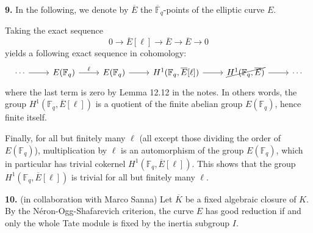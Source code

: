 \documentclass[a4paper]{article}
\newcommand{\Fq}{\mathbb{F}_q}
\newcommand{\Fqq}{\overline{\mathbb{F}}_q}
\newcommand{\E}{\overline{E}}
\theoremstyle{definition}
\theoremstyle{definition}
\theoremstyle{remark}
\theoremstyle{definition}
\begin{document}
\medskip\noindent\textbf{9.} In the following, we denote by $\E$ the $\Fqq$-points of the elliptic curve $E$.

\noindent Taking the exact sequence
\begin{equation*}
        0 \to \E[\ell] \to \E \to \E \to 0
\end{equation*}
yields a following exact sequence in cohomology:
\[
        \begin{tikzcd}
                \cdots \ar[r] & E(\Fq) \ar[r, "\ell"] &E(\Fq) \ar[r] &H^1(\Fq, \E[\ell]) \ar[r] &\cancel{H^1(\Fq, \E)} \ar[r] &\cdots
        \end{tikzcd}
\]
where the last term is zero by Lemma 12.12 in the notes. In others words, the group $H^1(\Fq, \E[\ell])$ is a quotient of the finite abelian group $E(\Fq)$, hence finite itself.

Finally, for all but finitely many $\ell$ (all except those dividing the order of $E(\Fq)$), multiplication by $\ell$ is an automorphism of the group $E(\Fq)$, which in particular has trivial cokernel $H^1(\Fq, \E[\ell])$. This shows that the group $H^1(\Fq, \E[\ell])$ is trivial for all but finitely many $\ell$.

\medskip\noindent\textbf{10.} (in collaboration with Marco Sanna)
\noindent Let $\overline{K}$ be a fixed algebraic closure of $K$. By the N\'eron-Ogg-Shafarevich criterion, the curve $E$ has good reduction if and only the whole Tate module is
fixed by the inertia subgroup $I$.
\end{document}
